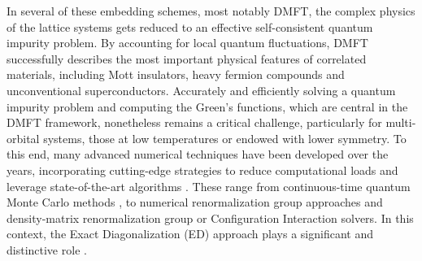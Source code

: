 \documentclass[edipack_sp.tex]{subfiles}
\begin{document}


In several of these embedding schemes, most notably DMFT, the complex physics of the lattice systems gets reduced to an effective self-consistent quantum impurity problem.
By accounting for local quantum fluctuations, DMFT successfully describes the most important physical features of correlated materials, including Mott insulators, heavy fermion compounds and unconventional superconductors.  
%
Accurately and efficiently solving a quantum impurity problem and computing the Green's functions, which are central in the DMFT framework, nonetheless remains a critical challenge, particularly for multi-orbital systems, those 
at low temperatures or endowed with lower symmetry.
%
To this end, 
many advanced numerical techniques have been developed over the years, incorporating cutting-edge strategies to reduce computational loads and leverage state-of-the-art algorithms \cite{Bauer2011JOSMTAE,Parcollet2015CPC}. 
These range from continuous-time quantum Monte Carlo 
methods \cite{Gull2011RMP,Rubtsov2005PRB,Haule2007PRB,Seth2016CPC,Wallerberger2019CPC},
to numerical renormalization group approaches \cite{Zitko2009PRB,Bulla2001PRB,Bulla2008RMP,Debertolis2021PRB} 
and density-matrix renormalization group \cite{Zitko2009PRB,Bulla2001PRB,Bulla2008RMP,Nunez-Fernandez2025A} or Configuration Interaction \cite{Zgid2012PRB,Lu2014PRB,Go2017PRB,Bi2019CPC,Mejuto-Zaera2019PRB} solvers. 
In this context, the Exact Diagonalization (ED) approach plays a significant 
and distinctive role \cite{Caffarel1994PRL,Dolfen2006,Perroni2007PRB,Capone2007PRB,Weber2012PRB,Lu2017TEPJST,Amaricci2022CPC}.
\end{document}
